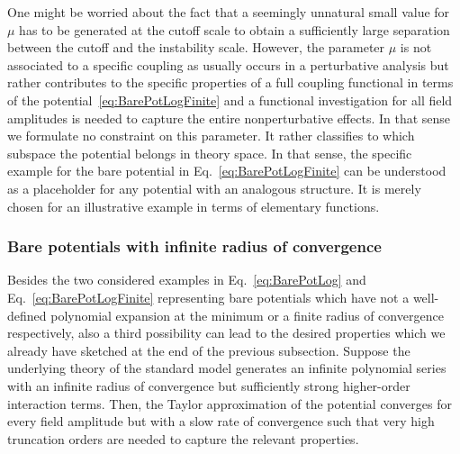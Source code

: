 \documentclass[twocolumn,aps,prd,showpacs,nofootinbib,superscriptaddress,preprintnumbers,floatfix,10pt]{revtex4-1}
\begin{document}
One might be worried about the fact that a seemingly unnatural small value for $\mu$ has to be generated at the cutoff scale to obtain a sufficiently large separation between the cutoff and the instability scale. However, the parameter $\mu$ is not associated to a specific coupling as usually occurs in a perturbative analysis but rather contributes to the specific properties of a full coupling functional in terms of the potential~\eqref{eq:BarePotLogFinite} and a functional investigation for all field amplitudes is needed to capture the entire nonperturbative effects. In that sense we formulate no constraint on this parameter. 
It rather classifies to which subspace the potential belongs in theory space.
In that sense, the specific example for the bare potential in Eq.~\eqref{eq:BarePotLogFinite} can be understood as a placeholder for any potential with an analogous structure. It is merely chosen for an illustrative example in terms of elementary functions. 



\subsubsection{Bare potentials with infinite radius of convergence}
Besides the two considered examples in Eq.~\eqref{eq:BarePotLog} and Eq.~\eqref{eq:BarePotLogFinite} representing bare potentials which have not a well-defined polynomial expansion at the minimum or a finite radius of convergence respectively, also a third possibility can lead to the desired properties which we already have sketched at the end of the previous subsection. Suppose the underlying theory of the standard model generates an infinite polynomial series with an infinite radius of convergence but sufficiently strong higher-order interaction terms. Then, the Taylor approximation of the potential converges for every field amplitude but with a slow rate of convergence such that very high truncation orders are needed to capture the relevant properties. 
\end{document}
